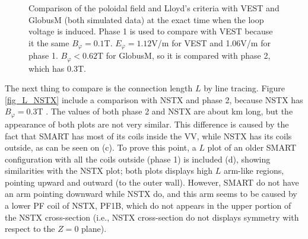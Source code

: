 \documentclass[a4paper,12pt,oneside]{book}
\begin{document}
%
\begin{figure}[htbp]
\centering
{}
\hfill
{}

\hfill
{}

\hfill
{}
\caption{Comparison of the poloidal field and Lloyd's criteria with VEST \cite{VEST_2015} and GlobusM \cite{Globus_2001} (both simulated data) at the exact time when the loop voltage is induced. Phase 1 is used to compare with VEST because it the same $B_\varphi=0.1$T. $E_\varphi=1.12$V/m for VEST and 1.06V/m for phase 1. $B_\varphi<0.62$T for GlobusM, so it is compared with phase 2, which has 0.3T.}
\label{fig_Bpol}
\end{figure}




The next thing to compare is the connection length $L$ by line tracing. Figure \ref{fig_L_NSTX} include a comparison with NSTX and phase 2, because NSTX has $B_\varphi=0.3$T \cite{NSTX_BT}. The values of both phase 2 and NSTX are about km long, but the appearance of both plots are not very similar. This difference is caused by the fact that SMART has most of its coils inside the VV, while NSTX has its coils outside, as can be seen on (c). To prove this point, a $L$ plot of an older SMART configuration with all the coils outside (phase 1) is included (d), showing similarities with the NSTX plot; both plots displays high $L$ arm-like regions, pointing upward and outward (to the outer wall). However, SMART do not have an arm pointing downward while NSTX do, and this arm seems to be caused by a lower PF coil of NSTX, PF1B, which do not appears in the upper portion of the NSTX cross-section (i.e., NSTX cross-section do not displays symmetry with respect to the $Z=0$ plane).
\end{document}
